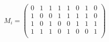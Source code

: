 \documentclass[11pt,a4paper]{article}
\begin{document}
\begin{eqnarray*}
  M_i = \left(\begin{array}{rrrrrrrr}
    0 & 1 & 1 & 1 & 1 & 0 & 1 & 0 \\
    1 & 0 & 0 & 1 & 1 & 1 & 1 & 0 \\
    1 & 0 & 1 & 0 & 0 & 1 & 1 & 1 \\
    1 & 1 & 1 & 0 & 1 & 0 & 0 & 1 \\
    \end{array}\right)
\end{eqnarray*}



\end{document}
